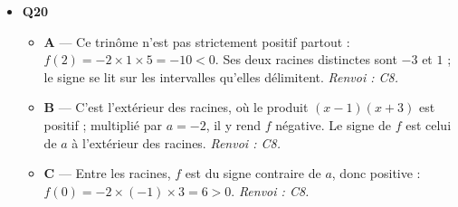 \begin{itemize}
\begin{itemize}
  \end{itemize}
  \item \textbf{Q20}
  \begin{itemize}
    \item \textbf{A} — Ce trinôme n’est pas strictement positif partout : $f(2)=-2\times1\times5=-10<0$. Ses deux racines distinctes sont $-3$ et $1$ ; le signe se lit sur les intervalles qu’elles délimitent. \emph{Renvoi : C8.}
    \item \textbf{B} — C'est l'extérieur des racines, où le produit $(x-1)(x+3)$ est positif ; multiplié par $a=-2$, il y rend $f$ négative. Le signe de $f$ est celui de $a$ à l'extérieur des racines. \emph{Renvoi : C8.}
    \item \textbf{C} — Entre les racines, $f$ est du signe contraire de $a$, donc positive : $f(0)=-2\times(-1)\times3=6>0$. \emph{Renvoi : C8.}
  \end{itemize}
\end{itemize}
\fi
